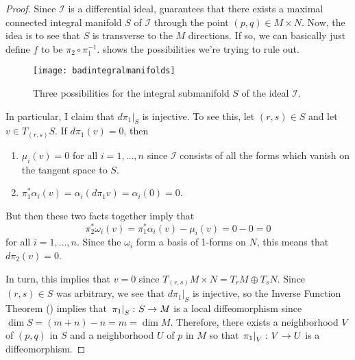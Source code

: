 \begin{proof}
	Since $\mathcal{I}$ is a differential ideal,  guarantees that there exists a maximal connected integral manifold $S$ of $\mathcal{I}$ through the point $(p,q) \in M \times N$. Now, the idea is to see that $S$ is transverse to the $M$ directions. If so, we can basically just define $f$ to be $\pi_2 \circ \pi_1^{-1}$.  shows the possibilities we're trying to rule out.
	
	\begin{figure}[htbp]
		\centering
			\texttt{[image: badintegralmanifolds]}
		\caption{Three possibilities for the integral submanifold $S$ of the ideal $\mathcal{I}$.}
		\label{fig:bad integral manifolds}
	\end{figure}
	
	In particular, I claim that $\left.d\pi_1 \right|_S$ is injective. To see this, let $(r,s) \in S$ and let $v \in T_{(r,s)} S$. If $d\pi_1(v) = 0$, then
	\begin{enumerate}
		\item $\mu_i(v) = 0$ for all $i=1, \dots , n$ since $\mathcal{I}$ consists of all the forms which vanish on the tangent space to $S$.
		\item $\pi_1^\ast \alpha_i(v) = \alpha_i(d\pi_1 v) = \alpha_i(0) = 0$.
	\end{enumerate}
	But then these two facts together imply that 
	\[
		\pi_2^\ast\omega_i(v) = \pi_1^\ast \alpha_i(v) - \mu_i(v) = 0-0=0
	\]
	for all $i=1, \dots , n$. Since the $\omega_i$ form a basis of 1-forms on $N$, this means that $d\pi_2(v) = 0$.
	
	In turn, this implies that $v = 0$ since $T_{(r,s)} M \times N = T_r M \oplus T_s N$. Since $(r,s) \in S$ was arbitrary, we see that $\left. d\pi_1 \right|_S$ is injective, so the Inverse Function Theorem () implies that $\left. \pi_1 \right|_S \colon\thinspace\! S \to M$ is a local diffeomorphism since $\dim S = (m+n)-n=m=\dim M$. Therefore, there exists a neighborhood $V$ of $(p,q)$ in $S$ and a neighborhood $U$ of $p$ in $M$ so that $\left. \pi_1 \right|_V \colon\thinspace\! V \to U$ is a diffeomorphism.
	

\end{proof}
